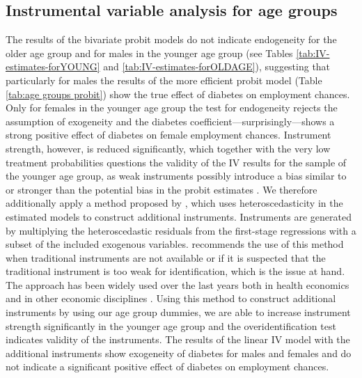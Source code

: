 \clearpage


\subsection*{Instrumental variable analysis for age groups}


The results of the bivariate probit models do not indicate
endogeneity for the older age group and for males in the younger age
group (see Tables \ref{tab:IV-estimates-forYOUNG} and \ref{tab:IV-estimates-forOLDAGE}),
suggesting that particularly for males the results of the more efficient
probit model (Table \ref{tab:age groups probit}) show the true effect
of diabetes on employment chances. Only for females in the younger
age group the test for endogeneity rejects the assumption of exogeneity
and the diabetes coefficient---surprisingly---shows a strong positive
effect of diabetes on female employment chances. Instrument strength,
however, is reduced significantly, which together with the very low
treatment probabilities questions the validity of the \ac{IV} results
for the sample of the younger age group, as weak instruments possibly
introduce a bias similar to or stronger than the potential bias in
the probit estimates \parencite{Staiger1997}. We therefore additionally
apply a method proposed by \textcite{Lewbel2012}, which uses heteroscedasticity
in the estimated models to construct additional instruments. Instruments
are generated by multiplying the heteroscedastic residuals from the
first-stage regressions with a subset of the included exogenous variables.
\textcite{Lewbel2012} recommends the use of this method when traditional
instruments are not available or if it is suspected that the traditional
instrument is too weak for identification, which is the issue at hand.
The approach has been widely used over the last years both in health
economics \parencite{Drichoutis2011,Kelly2012,Schroeter2012,Brown2014}
and in other economic disciplines \parencite{Huang2009a,Emran2012,Denny2013}.
Using this method to construct additional instruments by using our
age group dummies, we are able to increase instrument strength significantly
in the younger age group and the overidentification test indicates
validity of the instruments. The results of the linear \ac{IV} model
with the additional instruments show exogeneity of diabetes for males
and females and do not indicate a significant positive effect of diabetes
on employment chances.

